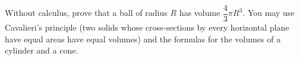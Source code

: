 Without calculus, prove that a ball of radius $R$ has volume $\dfrac{4}{3}\pi R^3$. You may use Cavalieri's principle (two solids whose cross-sections by every horizontal plane have equal areas have equal volumes) and the formulas for the volumes of a cylinder and a cone.
